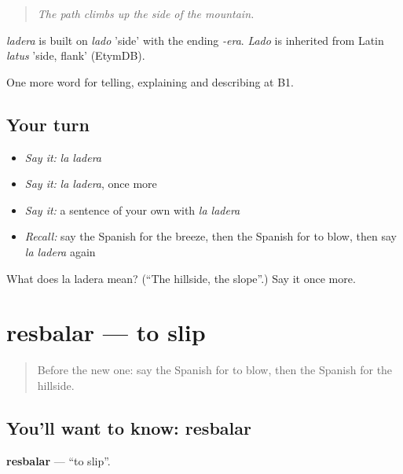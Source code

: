 \begin{quote}
\emph{The path climbs up the side of the mountain.}
\end{quote}

\begin{cousinweb}
\emph{ladera} is built on \emph{lado} 'side' with the ending \emph{-era}. \emph{Lado} is inherited from Latin \emph{latus} 'side, flank' (EtymDB).
\end{cousinweb}

\begin{grammarlens}[title={What you've built}]
One more word for telling, explaining and describing at B1.
\end{grammarlens}

\subsection*{Your turn}
\begin{itemize}
\raggedright
  \item \emph{Say it:} \emph{la ladera}
  \item \emph{Say it:} \emph{la ladera}, once more
  \item \emph{Say it:} a sentence of your own with \emph{la ladera}
  \item \emph{Recall:} say the Spanish for the breeze, then the Spanish for to blow, then say \emph{la ladera} again
\end{itemize}

\begin{tcolorbox}[breakable,colback=teal!4,colframe=teal!35!black,title={Before you move on}]
What does la ladera mean? (\textquotedblleft{}The hillside, the slope\textquotedblright{}.) Say it once more.
\end{tcolorbox}
\section[resbalar]{resbalar — to slip}

\label{lesson:ES-C772-resbalar}



\begin{quote}
Before the new one: say the Spanish for to blow, then the Spanish for the hillside.
\end{quote}

\subsection*{You'll want to know: resbalar}
\textbf{resbalar} — \textquotedblleft{}to slip\textquotedblright{}.

